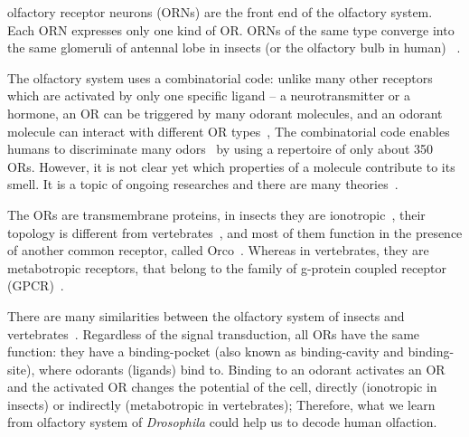 \documentclass[fleqn,10pt]{wlscirep} %
\begin{document}
olfactory receptor neurons (ORNs) are  the front end of the olfactory system.
Each ORN expresses only one kind of OR. 
ORNs of the same type converge into the same glomeruli of antennal lobe in insects (or the olfactory bulb in human)
~\cite{root2007,Carey2011,Vosshall2000,Couto2005,fishilevich2005,gao2000,wang1998,mombaerts1996,vassar1994}.

The olfactory system uses a combinatorial code: 
unlike many other receptors which are activated by only one specific ligand -- a neurotransmitter or a hormone,
an OR can be triggered by many odorant molecules, 
and an odorant molecule can interact with different OR types~\cite{Malnic2000},
The combinatorial code enables humans to discriminate many odors~\cite{Bushdid2014} by using a repertoire of only about 350 ORs.
However, it is not clear yet which properties of a molecule contribute to its smell. 
It is a topic of ongoing researches and there are many theories~\cite{Turin,Keller2004,Araneda2000,Brookes2007,Franco2011,Pelz2006,Gabler2013,Schmuker2007,Haddad2008,Snitz2013,Yablonka2012,gane2013,
turin2015plausibility,block2015implausibility,vosshall2015laying}.

The ORs are transmembrane proteins, 
in insects they are ionotropic~\cite{Sato2008,Wicher2008,Nagel2011,Rong2011}, 
their topology is different from vertebrates~\cite{Benton2006,Smart2008},
and most of them function in the presence of another common receptor, called Orco~\cite{Larsson2004}.
Whereas in vertebrates, they are metabotropic receptors, that belong to the family of g-protein coupled receptor (GPCR)~\cite{Buck1991,niimura2009evolutionary}. 

There are many similarities between the olfactory system of insects and vertebrates~\cite{Wilson2014,Kaupp2010}.
Regardless of the signal transduction, 
all ORs have the same function: they have a binding-pocket (also known as binding-cavity and binding-site),
where odorants (ligands) bind to. 
Binding to an odorant activates an OR and 
the activated OR changes the potential of the cell, 
directly (ionotropic in insects) or indirectly (metabotropic in vertebrates);
Therefore, what we learn from olfactory system of \textit{Drosophila} could help us to decode human olfaction. 
\end{document}
